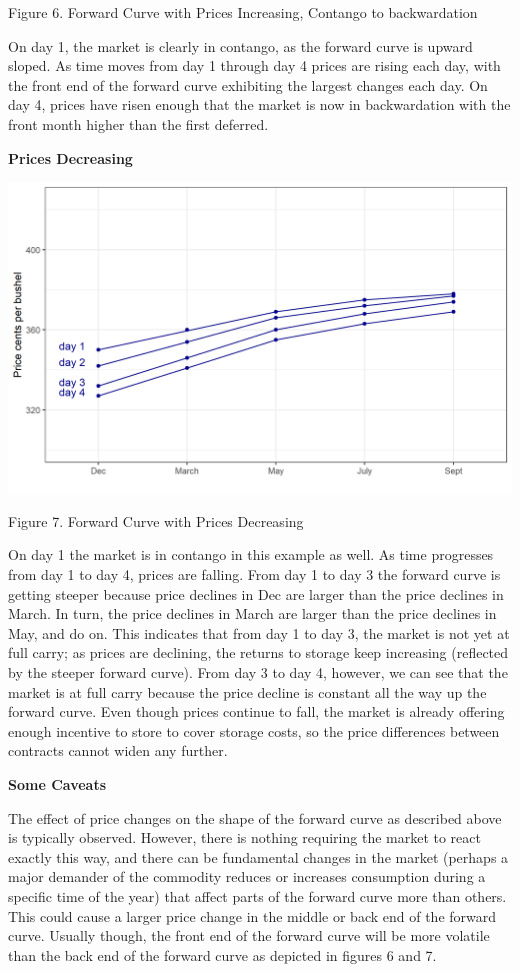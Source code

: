 \documentclass[
  letterpaper,
  DIV=11,
  numbers=noendperiod]{scrreprt}
\begin{document}
Figure 6. Forward Curve with Prices Increasing, Contango to
backwardation

On day 1, the market is clearly in contango, as the forward curve is
upward sloped. As time moves from day 1 through day 4 prices are rising
each day, with the front end of the forward curve exhibiting the largest
changes each day. On day 4, prices have risen enough that the market is
now in backwardation with the front month higher than the first
deferred.

\textbf{Prices Decreasing}

\includegraphics{assets/PricesSpaceTime-pricesdecreasing-hyp.png}

Figure 7. Forward Curve with Prices Decreasing

On day 1 the market is in contango in this example as well. As time
progresses from day 1 to day 4, prices are falling. From day 1 to day 3
the forward curve is getting steeper because price declines in Dec are
larger than the price declines in March. In turn, the price declines in
March are larger than the price declines in May, and do on. This
indicates that from day 1 to day 3, the market is not yet at full carry;
as prices are declining, the returns to storage keep increasing
(reflected by the steeper forward curve). From day 3 to day 4, however,
we can see that the market is at full carry because the price decline is
constant all the way up the forward curve. Even though prices continue
to fall, the market is already offering enough incentive to store to
cover storage costs, so the price differences between contracts cannot
widen any further.

\textbf{Some Caveats}

The effect of price changes on the shape of the forward curve as
described above is typically observed. However, there is nothing
requiring the market to react exactly this way, and there can be
fundamental changes in the market (perhaps a major demander of the
commodity reduces or increases consumption during a specific time of the
year) that affect parts of the forward curve more than others. This
could cause a larger price change in the middle or back end of the
forward curve. Usually though, the front end of the forward curve will
be more volatile than the back end of the forward curve as depicted in
figures 6 and 7.
\end{document}
